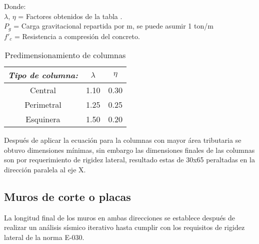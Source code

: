 \begin{flushleft}
Donde:\\
$\lambda$, $\eta$ = Factores obtenidos de la tabla .\\
$P_{g}$ = Carga gravitacional repartida por m, se puede asumir 1 ton/m\\
$f'_{c}$ = Resistencia a compresión del concreto.\\
\end{flushleft}

\begin{table}[htbp]
  \centering
  \caption{Predimensionamiento de columnas}
    \begin{tabular}{|c|c|c|}
    \hline
    \rowcolor[rgb]{ .906,  .902,  .902} \textit{\textbf{Tipo de columna:}} & \multicolumn{1}{p{10.665em}|}{\centering\textbf{$\lambda$}} & \multicolumn{1}{p{11.945em}|}{\centering\textbf{$\eta$}} \\
    \hline
    \rowcolor[rgb]{ .906,  .902,  .902} Central & \cellcolor[rgb]{ 1,  1,  1}1.10 & \cellcolor[rgb]{ 1,  1,  1}0.30 \\
    \hline
    \rowcolor[rgb]{ .906,  .902,  .902} Perimetral & \cellcolor[rgb]{ 1,  1,  1}1.25 & \cellcolor[rgb]{ 1,  1,  1}0.25 \\
    \hline
    \rowcolor[rgb]{ .906,  .902,  .902} Esquinera & \cellcolor[rgb]{ 1,  1,  1}1.50 & \cellcolor[rgb]{ 1,  1,  1}0.20 \\
    \hline
    \end{tabular}%
  \label{tab:addlabel}%
\end{table}%

Después de aplicar la ecuación  para la columnas con mayor área tributaria se obtuvo dimensiones mínimas, sin embargo las dimensiones finales de las columnas son por requerimiento de rigidez lateral, resultado estas de 30x65 peraltadas en la dirección paralela al eje X.


\subsection{Muros de corte o placas}

La longitud final de los muros en ambas direcciones se establece después de realizar un análisis sísmico iterativo hasta cumplir con los requisitos de rigidez lateral de la norma E-030.